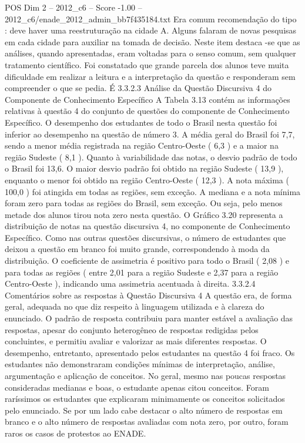 \begin{textsample}{POS Dim 2 – 2012\_c6 – Score -1.00 – 2012\_c6/enade\_2012\_admin\_bb7f435184.txt}
Era comum recomendação do tipo : deve haver uma reestruturação na cidade A.
Alguns falaram de novas pesquisas em cada cidade para auxiliar na tomada de decisão.
Neste item destaca -se que as análises, quando apresentadas, eram voltadas para o senso comum, sem qualquer tratamento científico.
Foi constatado que grande parcela dos alunos teve muita dificuldade em realizar a leitura e a interpretação da questão e responderam sem compreender o que se pedia.
É 3.3.2.3 Análise da Questão Discursiva 4 do Componente de Conhecimento Específico A Tabela 3.13 contém as informações relativas à questão 4 do conjunto de questões do componente de Conhecimento Específico.
O desempenho dos estudantes de todo o Brasil nesta questão foi inferior ao desempenho na questão de número 3.
A média geral do Brasil foi 7,7, sendo a menor média registrada na região Centro-Oeste ( 6,3 ) e a maior na região Sudeste ( 8,1 ).
Quanto à variabilidade das notas, o desvio padrão de todo o Brasil foi 13,6.
O maior desvio padrão foi obtido na região Sudeste ( 13,9 ), enquanto o menor foi obtido na região Centro-Oeste ( 12,3 ).
A nota máxima ( 100,0 ) foi atingida em todas as regiões, sem exceção.
A mediana e a nota mínima foram zero para todas as regiões do Brasil, sem exceção.
Ou seja, pelo menos metade dos alunos tirou nota zero nesta questão.
O Gráfico 3.20 representa a distribuição de notas na questão discursiva 4, no componente de Conhecimento Específico.
Como nas outras questões discursivas, o número de estudantes que deixou a questão em branco foi muito grande, correspondendo à moda da distribuição.
O coeficiente de assimetria é positivo para todo o Brasil ( 2,08 ) e para todas as regiões ( entre 2,01 para a região Sudeste e 2,37 para a região Centro-Oeste ), indicando uma assimetria acentuada à direita. 3.3.2.4 Comentários sobre as respostas à Questão Discursiva 4 A questão era, de forma geral, adequada no que diz respeito à linguagem utilizada e à clareza do enunciado.
O padrão de resposta contribuiu para manter estável a avaliação das respostas, apesar do conjunto heterogêneo de respostas redigidas pelos concluintes, e permitiu avaliar e valorizar as mais diferentes respostas.
O desempenho, entretanto, apresentado pelos estudantes na questão 4 foi fraco.
Os estudantes não demonstraram condições mínimas de interpretação, análise, argumentação e aplicação de conceitos.
No geral, mesmo nas poucas respostas consideradas medianas e boas, o estudante apenas citou conceitos.
Foram raríssimos os estudantes que explicaram minimamente os conceitos solicitados pelo enunciado.
Se por um lado cabe destacar o alto número de respostas em branco e o alto número de respostas avaliadas com nota zero, por outro, foram raros os casos de protestos ao ENADE.

\end{textsample}
